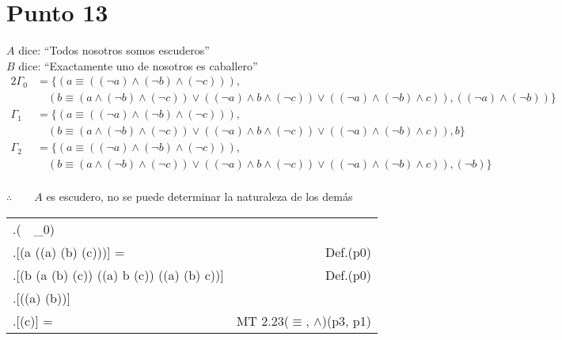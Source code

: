 \documentclass{article}
\newcommand{\q}[1]{``#1''}
\newcommand{\val}[2]{\mathbf{#1}[#2]}
\newlength{\logicv}
\newenvironment{logicenv}[2][0]{
  \begin{tcolorbox}[demo, title = #2]
  \vspace*{#1\logicv}
}{
  \end{tcolorbox}
  \vspace*{-.5cm}
}
\newenvironment{subproofill}[1][0]{
  \begin{tcolorbox}[demo, title = ]
    \vspace*{-#1\logicv}
}{
  \end{tcolorbox}
  \vspace*{-.5cm}
}
\newenvironment{subproof}[2][0]{
  \begin{tcolorbox}[demo, title = #2, colframe = black]
  \vspace*{#1\logicv}
  \begin{logic}
}{
  \end{logic}
  \end{tcolorbox}
}
\newenvironment{logic}{
    \setlength{\extrarowheight}{3pt}
    \setcounter{row}{-1}
    \begin{center}
    \begin{NiceTabular}{>{\stepcounter{row}\therow.\hspace*{5pt}} L r }
}{
    \end{NiceTabular}
    \end{center}
}
\begin{document}
\section{Punto 13}
\begin{logicenv}[5]{Punto 13}
  $A$ dice: \q{Todos nosotros somos escuderos}\\
  $B$ dice: \q{Exactamente uno de nosotros es caballero}
  \begin{alignat*}{2}
    \Gamma_0 &= \{(a \equiv ((\neg a) \land (\neg b) \land (\neg c))),\\
    & \quad (b \equiv (a \land (\neg b) \land (\neg c)) \lor ((\neg a) \land b \land (\neg c)) \lor ((\neg a) \land (\neg b) \land c)), ((\neg a) \land (\neg b))\}\\
    \Gamma_1 &= \{(a \equiv ((\neg a) \land (\neg b) \land (\neg c))),\\
    & \quad (b \equiv (a \land (\neg b) \land (\neg c)) \lor ((\neg a) \land b \land (\neg c)) \lor ((\neg a) \land (\neg b) \land c)), b\}\\
    \Gamma_2 &= \{(a \equiv ((\neg a) \land (\neg b) \land (\neg c))),\\
    & \quad (b \equiv (a \land (\neg b) \land (\neg c)) \lor ((\neg a) \land b \land (\neg c)) \lor ((\neg a) \land (\neg b) \land c)), (\neg b)\}
  \end{alignat*}
  \makebox[11.5cm]{\hrulefill}\\
  $\therefore \qquad A$ es escudero, no se puede determinar la naturaleza de los demás
\end{logicenv}
\begin{subproofill}
  \begin{subproof}[5]{Con $\Gamma_0$}
    (\exists {}\, \vert\,   \Gamma_0)\\
    \val{v}{(a \equiv ((\neg a) \land (\neg b) \land (\neg c)))} =  & Def.(p0)\\
    \val{v}{(b \equiv (a \land (\neg b) \land (\neg c)) \lor ((\neg a) \land b \land (\neg c)) \lor ((\neg a) \land (\neg b) \land c))} & Def.(p0)\\
    \val{v}{((\neg a) \land (\neg b))}\\
    \val{v}{(\neg c)} =  & MT 2.23($\equiv$, $\land$)(p3, p1)\\
  \end{subproof}
\end{subproofill}
\end{document}
